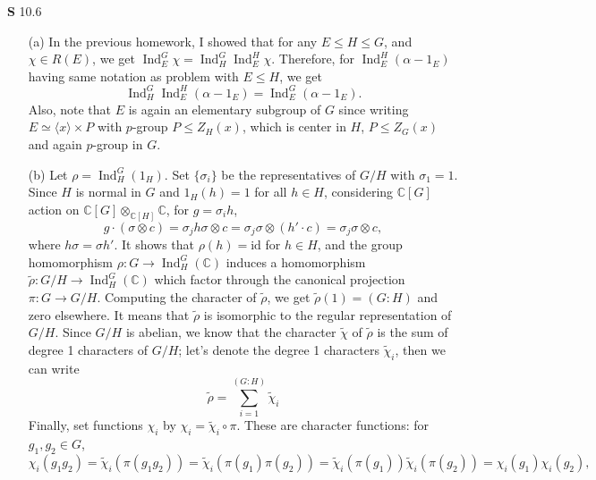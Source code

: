 \documentclass[a4paper, 12pt]{article}
\theoremstyle{Mydefinition}
\theoremstyle{Mytheorem}
\DeclareMathOperator{\Ind}{Ind}
\begin{document}
\noindent \textbf{S} 10.6
\begin{enumerate}
    \item[(a)] In the previous homework, I showed that for any $E\leq H\leq G$, and $\chi\in R(E)$, we get $\Ind_E^G \chi = \Ind_H^G\Ind_E^H \chi$. Therefore, for $\Ind_E^H(\alpha-1_E)$ having same notation as problem with $E\leq H$, we get
    \begin{equation}
        \Ind_H^G\Ind_E^H(\alpha-1_E) = \Ind_E^G(\alpha-1_E).
    \end{equation}
    Also, note that $E$ is again an elementary subgroup of $G$ since writing $E \simeq \langle x\rangle \times P$ with $p$-group $P\leq Z_H(x)$, which is center in $H$, $P\leq Z_G(x)$ and again $p$-group in $G$.
    \item[(b)] Let $\rho = \Ind_H^G(1_H)$. Set $\{\sigma_i\}$ be the representatives of $G/H$ with $\sigma_1 = 1$. Since $H$ is normal in $G$ and $1_H(h) = 1$ for all $h\in H$, considering $\mathbb{C}[G]$ action on $\mathbb{C}[G]\otimes_{\mathbb{C}[H]}\mathbb{C}$, for $g =\sigma_i h$,
    \begin{equation}
        g\cdot(\sigma \otimes c) = \sigma_j h \sigma \otimes c = \sigma_j \sigma \otimes (h'\cdot c) = \sigma_j\sigma \otimes c,
    \end{equation}
    where $h\sigma = \sigma h'$. It shows that $\rho(h)=\mathrm{id}$ for $h\in H$, and the group homomorphism $\rho:G\rightarrow \Ind_H^G(\mathbb{C})$ induces a homomorphism $\tilde{\rho}:G/H\rightarrow \Ind_H^G(\mathbb{C})$ which factor through the canonical projection $\pi:G\rightarrow G/H$. Computing the character of $\tilde{\rho}$, we get $\tilde{\rho}(1) = (G:H)$ and zero elsewhere. It means that $\tilde{\rho}$ is isomorphic to the regular representation of $G/H$. Since $G/H$ is abelian, we know that the character $\tilde{\chi}$ of $\tilde{\rho}$ is the sum of degree 1 characters of $G/H$; let's denote the degree 1 characters $\tilde{\chi}_i$, then we can write
    \begin{equation}
        \tilde{\rho} = \sum_{i=1}^{(G:H)}\tilde{\chi}_i
    \end{equation}
    Finally, set functions $\chi_i$ by $\chi_i = \tilde{\chi}_i\circ \pi$. These are character functions: for $g_1,g_2\in G$,
    \begin{equation}
        \chi_i(g_1g_2) = \tilde{\chi}_i\left(\pi(g_1g_2)\right) = \tilde{\chi}_i\left(\pi(g_1)\pi(g_2)\right) = \tilde{\chi}_i(\pi(g_1))\tilde{\chi}_i(\pi(g_2)) = \chi_i(g_1)\chi_i(g_2),
    \end{equation}

\end{enumerate}
\end{document}
